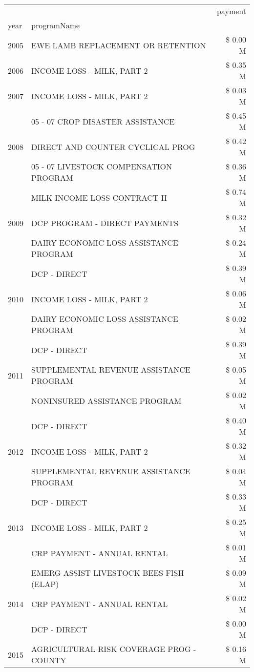 \begin{tabular}{llr}
\toprule
 &  & payment \\
year & programName &  \\
\midrule
2005 & EWE LAMB REPLACEMENT OR RETENTION & \$ 0.00 M \\
\cline{1-3}
2006 & INCOME LOSS - MILK, PART 2 & \$ 0.35 M \\
\cline{1-3}
2007 & INCOME LOSS - MILK, PART 2 & \$ 0.03 M \\
\cline{1-3}
\multirow[t]{3}{*}{2008} & 05 - 07 CROP DISASTER ASSISTANCE & \$ 0.45 M \\
 & DIRECT AND COUNTER CYCLICAL PROG & \$ 0.42 M \\
 & 05 - 07 LIVESTOCK COMPENSATION PROGRAM & \$ 0.36 M \\
\cline{1-3}
\multirow[t]{3}{*}{2009} & MILK INCOME LOSS CONTRACT II & \$ 0.74 M \\
 & DCP PROGRAM - DIRECT PAYMENTS & \$ 0.32 M \\
 & DAIRY ECONOMIC LOSS ASSISTANCE PROGRAM & \$ 0.24 M \\
\cline{1-3}
\multirow[t]{3}{*}{2010} & DCP - DIRECT & \$ 0.39 M \\
 & INCOME LOSS - MILK, PART 2 & \$ 0.06 M \\
 & DAIRY ECONOMIC LOSS ASSISTANCE PROGRAM & \$ 0.02 M \\
\cline{1-3}
\multirow[t]{3}{*}{2011} & DCP - DIRECT & \$ 0.39 M \\
 & SUPPLEMENTAL REVENUE ASSISTANCE PROGRAM & \$ 0.05 M \\
 & NONINSURED ASSISTANCE PROGRAM & \$ 0.02 M \\
\cline{1-3}
\multirow[t]{3}{*}{2012} & DCP - DIRECT & \$ 0.40 M \\
 & INCOME LOSS - MILK, PART 2 & \$ 0.32 M \\
 & SUPPLEMENTAL REVENUE ASSISTANCE PROGRAM & \$ 0.04 M \\
\cline{1-3}
\multirow[t]{3}{*}{2013} & DCP - DIRECT & \$ 0.33 M \\
 & INCOME LOSS - MILK, PART 2 & \$ 0.25 M \\
 & CRP PAYMENT - ANNUAL RENTAL & \$ 0.01 M \\
\cline{1-3}
\multirow[t]{3}{*}{2014} & EMERG ASSIST LIVESTOCK BEES FISH (ELAP) & \$ 0.09 M \\
 & CRP PAYMENT - ANNUAL RENTAL & \$ 0.02 M \\
 & DCP - DIRECT & \$ 0.00 M \\
\cline{1-3}
\multirow[t]{3}{*}{2015} & AGRICULTURAL RISK COVERAGE PROG - COUNTY & \$ 0.16 M \\

\end{tabular}
